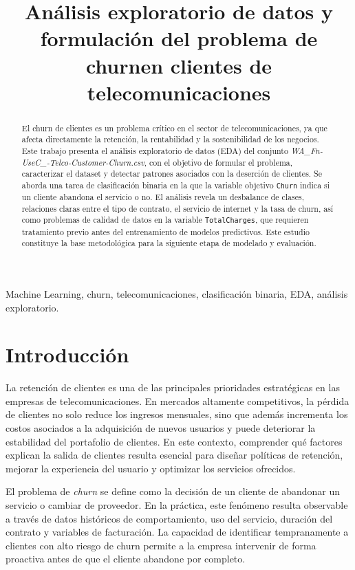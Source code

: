 \documentclass[conference]{IEEEtran}
\title{Análisis exploratorio de datos y formulación del problema de churn\break en clientes de telecomunicaciones}
\author{
\IEEEauthorblockN{Equipo de Proyecto 1}
\IEEEauthorblockA{Universidad\,--\, Curso de Machine Learning\\
Proyecto Final -- Etapa 1}
}
\begin{document}
\maketitle

\begin{abstract}
El churn de clientes es un problema crítico en el sector de telecomunicaciones, ya que afecta directamente la retención, la rentabilidad y la sostenibilidad de los negocios. Este trabajo presenta el análisis exploratorio de datos (EDA) del conjunto \textit{WA\_Fn-UseC\_-Telco-Customer-Churn.csv}, con el objetivo de formular el problema, caracterizar el dataset y detectar patrones asociados con la deserción de clientes. Se aborda una tarea de clasificación binaria en la que la variable objetivo \texttt{Churn} indica si un cliente abandona el servicio o no. El análisis revela un desbalance de clases, relaciones claras entre el tipo de contrato, el servicio de internet y la tasa de churn, así como problemas de calidad de datos en la variable \texttt{TotalCharges}, que requieren tratamiento previo antes del entrenamiento de modelos predictivos. Este estudio constituye la base metodológica para la siguiente etapa de modelado y evaluación.
\end{abstract}

\begin{IEEEkeywords}
Machine Learning, churn, telecomunicaciones, clasificación binaria, EDA, análisis exploratorio.
\end{IEEEkeywords}

\section{Introducción}
La retención de clientes es una de las principales prioridades estratégicas en las empresas de telecomunicaciones. En mercados altamente competitivos, la pérdida de clientes no solo reduce los ingresos mensuales, sino que además incrementa los costos asociados a la adquisición de nuevos usuarios y puede deteriorar la estabilidad del portafolio de clientes. En este contexto, comprender qué factores explican la salida de clientes resulta esencial para diseñar políticas de retención, mejorar la experiencia del usuario y optimizar los servicios ofrecidos.

El problema de\textit{ churn } se define como la decisión de un cliente de abandonar un servicio o cambiar de proveedor. En la práctica, este fenómeno resulta observable a través de datos históricos de comportamiento, uso del servicio, duración del contrato y variables de facturación. La capacidad de identificar tempranamente a clientes con alto riesgo de churn permite a la empresa intervenir de forma proactiva antes de que el cliente abandone por completo.
\end{document}

